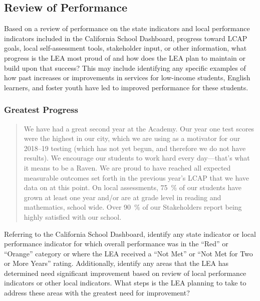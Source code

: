 \documentclass{article}
\newcounter{goal}[section] %
\begin{document}
\subsection{Review of Performance}

Based on a review of performance on the state indicators and local performance indicators included in the California School Dashboard, progress toward LCAP goals, local self-assessment tools, stakeholder input, or other information, what progress is the LEA most proud of and how does the LEA plan to maintain or build upon that success? This may include identifying any specific examples of how past increases or improvements in services for low-income students, English learners, and foster youth have led to improved performance for these students.
\subsubsection{Greatest Progress}
\begin{quotation}	
	We have had a great second year at the Academy. Our year one test scores were the highest in our city, which we are using as a motivator for our 2018--19 testing (which has not yet begun, and therefore we do not have results). We encourage our students to work hard every day---that's what it means to be a Raven. We are proud to have reached all expected measurable outcomes set forth in the previous year's LCAP that we have data on at this point. On local assessments, \SI{75}{\percent} of our students have grown at least one year and/or are at grade level in reading and mathematics, school wide. Over \SI{90}{\percent} of our Stakeholders report being highly satisfied with our school.
\end{quotation}

Referring to the California School Dashboard, identify any state indicator or local performance indicator for which overall performance was in the ``Red'' or ``Orange'' category or where the LEA received a ``Not Met'' or ``Not Met for Two or More Years'' rating. Additionally, identify any areas that the LEA has determined need significant improvement based on review of local performance indicators or other local indicators. What steps is the LEA planning to take to address these areas with the greatest need for improvement?
\end{document}
